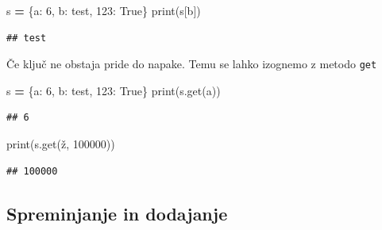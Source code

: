 \documentclass[
]{report}
\newenvironment{Shaded}{\begin{snugshade}}{\end{snugshade}}
\newcommand{\BuiltInTok}[1]{#1}
\newcommand{\DecValTok}[1]{\textcolor[rgb]{0.00,0.00,0.81}{#1}}
\newcommand{\NormalTok}[1]{#1}
\newcommand{\OperatorTok}[1]{\textcolor[rgb]{0.81,0.36,0.00}{\textbf{#1}}}
\newcommand{\StringTok}[1]{\textcolor[rgb]{0.31,0.60,0.02}{#1}}
\newcommand{\VariableTok}[1]{\textcolor[rgb]{0.00,0.00,0.00}{#1}}
\begin{document}
\begin{Shaded}
\begin{Highlighting}[]
\NormalTok{s }\OperatorTok{=}\NormalTok{ \{}\StringTok{\textquotesingle{}a\textquotesingle{}}\NormalTok{: }\DecValTok{6}\NormalTok{, }\StringTok{\textquotesingle{}b\textquotesingle{}}\NormalTok{: }\StringTok{\textquotesingle{}test\textquotesingle{}}\NormalTok{, }\DecValTok{123}\NormalTok{: }\VariableTok{True}\NormalTok{\}}
\BuiltInTok{print}\NormalTok{(s[}\StringTok{\textquotesingle{}b\textquotesingle{}}\NormalTok{])}
\end{Highlighting}
\end{Shaded}

\begin{verbatim}
## test
\end{verbatim}

Če ključ ne obstaja pride do napake. Temu se lahko izognemo z metodo \texttt{get}

\begin{Shaded}
\begin{Highlighting}[]
\NormalTok{s }\OperatorTok{=}\NormalTok{ \{}\StringTok{\textquotesingle{}a\textquotesingle{}}\NormalTok{: }\DecValTok{6}\NormalTok{, }\StringTok{\textquotesingle{}b\textquotesingle{}}\NormalTok{: }\StringTok{\textquotesingle{}test\textquotesingle{}}\NormalTok{, }\DecValTok{123}\NormalTok{: }\VariableTok{True}\NormalTok{\}}
\BuiltInTok{print}\NormalTok{(s.get(}\StringTok{\textquotesingle{}a\textquotesingle{}}\NormalTok{))}
\end{Highlighting}
\end{Shaded}

\begin{verbatim}
## 6
\end{verbatim}

\begin{Shaded}
\begin{Highlighting}[]
\BuiltInTok{print}\NormalTok{(s.get(}\StringTok{\textquotesingle{}ž\textquotesingle{}}\NormalTok{, }\DecValTok{100000}\NormalTok{))}
\end{Highlighting}
\end{Shaded}

\begin{verbatim}
## 100000
\end{verbatim}

\hypertarget{spreminjanje-in-dodajanje}{%
\subsection{Spreminjanje in dodajanje}\label{spreminjanje-in-dodajanje}}
\end{document}
